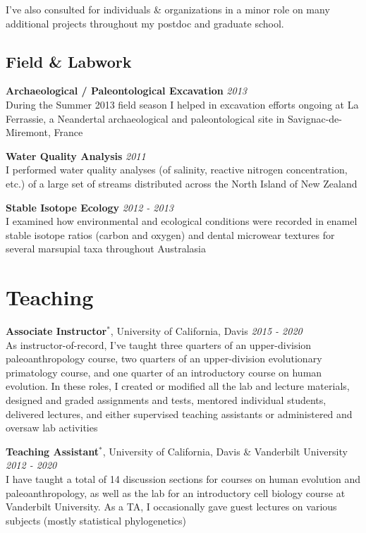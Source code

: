 \documentclass[12pt]{article}
\begin{document}
I've also consulted for individuals \& organizations in a minor role on many additional projects throughout my postdoc and graduate school.

\subsection{Field \& Labwork}

\textbf{Archaeological / Paleontological Excavation} \hfill \emph{2013}\\
During the Summer 2013 field season I helped in excavation efforts ongoing at La Ferrassie, a Neandertal archaeological and paleontological site in Savignac-de-Miremont, France

\textbf{Water Quality Analysis} \hfill \emph{2011}\\
I performed water quality analyses (of salinity, reactive nitrogen concentration, etc.) of a large set of streams distributed across the North Island of New Zealand

\textbf{Stable Isotope Ecology} \hfill \emph{2012 - 2013}\\
I examined how environmental and ecological conditions were recorded in enamel stable isotope ratios (carbon and oxygen) and dental microwear textures for several marsupial taxa throughout Australasia

\section{Teaching}

\textbf{Associate Instructor$^{*}$}, University of California, Davis \hfill \emph{2015  - 2020}\\
As instructor-of-record, I’ve taught three quarters of an upper-division paleoanthropology course, two quarters of an upper-division evolutionary primatology course, and one quarter of an introductory course on human evolution. In these roles, I created or modified all the lab and lecture materials, designed and graded assignments and tests, mentored individual students, delivered lectures, and either supervised teaching assistants or administered and oversaw lab activities

\textbf{Teaching Assistant$^{*}$}, University of California, Davis \& Vanderbilt University \hfill \emph{2012  - 2020}\\
I have taught a total of 14 discussion sections for courses on human evolution and paleoanthropology, as well as the lab for an introductory cell biology course at Vanderbilt University. As a TA, I occasionally gave guest lectures on various subjects (mostly statistical phylogenetics)
\end{document}
